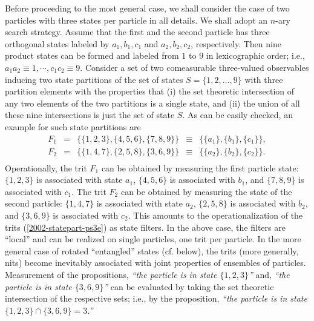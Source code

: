 Before proceeding to the most general case,
we shall consider the case of two particles
with three states per particle in all details.
We shall adopt an $n$-ary search strategy.
Assume that the first and the second particle
has three orthogonal states labeled by
$a_1,b_1,c_1$
and
$a_2,b_2,c_2$,
respectively.
Then nine product states can be formed and labeled from $1$ to $9$ in
lexicographic order; i.e.,
$
a_1a_2 \equiv 1,   \cdots , c_1c_2 \equiv 9
$.
Consider a set of two
comeasurable three-valued observables inducing two state partitions
of the set of states $S=\{1,2,\ldots , 9\}$ with three partition
elements with the properties
that (i) the set theoretic intersection of any two elements of the two
partitions is a single state, and (ii) the union of all these nine
intersections is just the set of state $S$.
As can be easily checked, an example for such state partitions are
\begin{equation}
\begin{array}{llllll}
F_1&=&\{\{1,2,3\},\{4,5,6\},\{7,8,9\}\}&\equiv& \{\{a_1\},\{b_1\},\{c_1\}\},\\
F_2&=&\{\{1,4,7\},\{2,5,8\},\{3,6,9\}\}&\equiv& \{\{a_2\},\{b_2\},\{c_2\}\}.\\
\end{array}
\label{2002-statepart-ps3e}
\end{equation}
Operationally, the trit $F_1$ can be obtained by
measuring the first particle state:
$\{1,2,3\}$ is associated with state $a_1$,
$\{4,5,6\}$ is associated with $b_1$,  and
$\{7,8,9\}$ is associated with $c_1$.
The trit $F_2$ can be obtained by
measuring the state of the second particle:
$\{1,4,7\}$ is associated with state $a_2$,
$\{2,5,8\}$ is associated with $b_2$,  and
$\{3,6,9\}$ is associated with $c_2$.
This amounts to the operationalization of the trits (\ref{2002-statepart-ps3e})
as state filters.
In the above case, the filters are ``local'' and can be realized on single particles,
one trit per particle.
In the more general case of rotated ``entangled'' states (cf. below),
the trits (more generally, nits) become
inevitably associated with joint properties of ensembles of particles.
Measurement of the propositions,
{\em ``the particle is in state $\{1,2,3\}$''}
and,
{\em ``the particle is in state $\{3,6,9\}$''}
can be evaluated by taking the set theoretic intersection of the respective sets; i.e., by
the proposition,
{\em ``the particle is in state $\{1,2,3\}\cap \{3,6,9\} = 3$.''}

